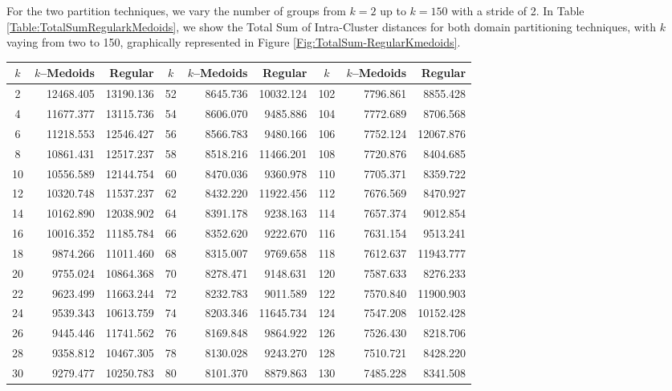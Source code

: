 For the two partition techniques, we vary the number of groups from $k=2$ up to $k=150$ with a stride of 2. In Table \ref{Table:TotalSumRegularkMedoids}, we show the Total Sum of Intra-Cluster distances for both domain partitioning techniques, with $k$ vaying from two to 150, graphically represented in Figure \ref{Fig:TotalSum-RegularKmedoids}. 
\begin{table}[h]
	\centering
	\tiny
	\begin{tabular}{|c|r|r|c|r|r|c|r|r|}
		\hline
		$k$  & $k$--Medoids & Regular & $k$ & $k$--Medoids & Regular & $k$ & $k$--Medoids & Regular \\ \hline
		2  & 12468.405 & 13190.136 &  52 & 8645.736 & 10032.124 & 102 & 7796.861 &  8855.428 \\
		4  & 11677.377 & 13115.736 &  54 & 8606.070 &  9485.886 & 104 & 7772.689 &  8706.568 \\
		6  & 11218.553 & 12546.427 &  56 & 8566.783 &  9480.166 & 106 & 7752.124 & 12067.876 \\
		8  & 10861.431 & 12517.237 &  58 & 8518.216 & 11466.201 & 108 & 7720.876 &  8404.685 \\
		10 & 10556.589 & 12144.754 &  60 & 8470.036 &  9360.978 & 110 & 7705.371 &  8359.722 \\
		12 & 10320.748 & 11537.237 &  62 & 8432.220 & 11922.456 & 112 & 7676.569 &  8470.927 \\
		14 & 10162.890 & 12038.902 &  64 & 8391.178 &  9238.163 & 114 & 7657.374 &  9012.854 \\
		16 & 10016.352 & 11185.784 &  66 & 8352.620 &  9222.670 & 116 & 7631.154 &  9513.241 \\
		18 &  9874.266 & 11011.460 &  68 & 8315.007 &  9769.658 & 118 & 7612.637 & 11943.777 \\
		20 &  9755.024 & 10864.368 &  70 & 8278.471 &  9148.631 & 120 & 7587.633 &  8276.233 \\
		22 &  9623.499 & 11663.244 &  72 & 8232.783 &  9011.589 & 122 & 7570.840 & 11900.903 \\
		24 &  9539.343 & 10613.759 &  74 & 8203.346 & 11645.734 & 124 & 7547.208 & 10152.428 \\
		26 &  9445.446 & 11741.562 &  76 & 8169.848 &  9864.922 & 126 & 7526.430 &  8218.706 \\
		28 &  9358.812 & 10467.305 &  78 & 8130.028 &  9243.270 & 128 & 7510.721 &  8428.220 \\
		30 &  9279.477 & 10250.783 &  80 & 8101.370 &  8879.863 & 130 & 7485.228 &  8341.508 \\

\end{tabular}
\end{table}
